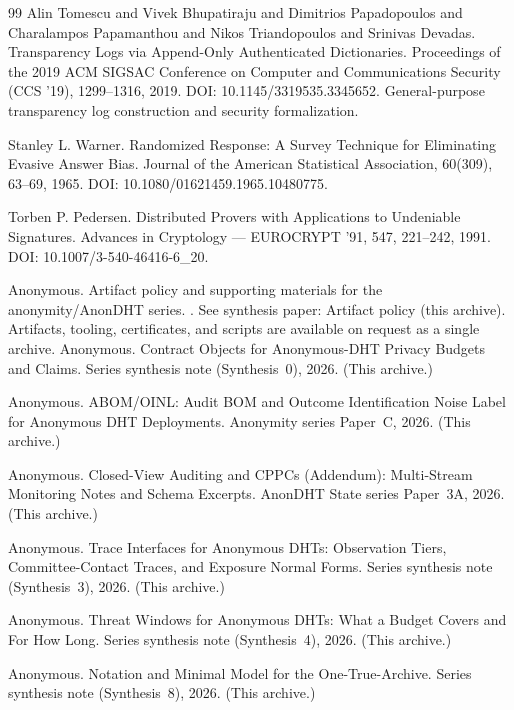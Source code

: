 \documentclass[11pt]{article}
\begin{document}
\begin{thebibliography}{99}
Alin Tomescu and Vivek Bhupatiraju and Dimitrios Papadopoulos and Charalampos Papamanthou and Nikos Triandopoulos and Srinivas Devadas.
\newblock Transparency Logs via Append-Only Authenticated Dictionaries.
\newblock Proceedings of the 2019 {ACM} SIGSAC Conference on Computer and Communications Security (CCS '19), 1299--1316, 2019.
\newblock DOI: 10.1145/3319535.3345652.
\newblock General-purpose transparency log construction and security formalization.

Stanley L. Warner.
\newblock Randomized Response: A Survey Technique for Eliminating Evasive Answer Bias.
\newblock Journal of the American Statistical Association, 60(309), 63--69, 1965.
\newblock DOI: 10.1080/01621459.1965.10480775.

Torben P. Pedersen.
\newblock Distributed Provers with Applications to Undeniable Signatures.
\newblock Advances in Cryptology --- {EUROCRYPT} '91, 547, 221--242, 1991.
\newblock DOI: 10.1007/3-540-46416-6\_20.

Anonymous.
\newblock Artifact policy and supporting materials for the anonymity/AnonDHT series.
.
\newblock See synthesis paper: Artifact policy (this archive). Artifacts, tooling, certificates, and scripts are available on request as a single archive.
Anonymous.
\newblock Contract Objects for Anonymous-DHT Privacy Budgets and Claims.
\newblock Series synthesis note (Synthesis~0), 2026. (This archive.)

Anonymous.
\newblock ABOM/OINL: Audit BOM and Outcome Identification Noise Label for Anonymous DHT Deployments.
\newblock Anonymity series Paper~C, 2026. (This archive.)

Anonymous.
\newblock Closed-View Auditing and CPPCs (Addendum): Multi-Stream Monitoring Notes and Schema Excerpts.
\newblock AnonDHT State series Paper~3A, 2026. (This archive.)

Anonymous.
\newblock Trace Interfaces for Anonymous {DHT}s: Observation Tiers, Committee-Contact Traces, and Exposure Normal Forms.
\newblock Series synthesis note (Synthesis~3), 2026. (This archive.)

Anonymous.
\newblock Threat Windows for Anonymous {DHT}s: What a Budget Covers and For How Long.
\newblock Series synthesis note (Synthesis~4), 2026. (This archive.)


Anonymous.
\newblock Notation and Minimal Model for the One-True-Archive.
\newblock Series synthesis note (Synthesis~8), 2026. (This archive.)

\end{thebibliography}
\end{document}
